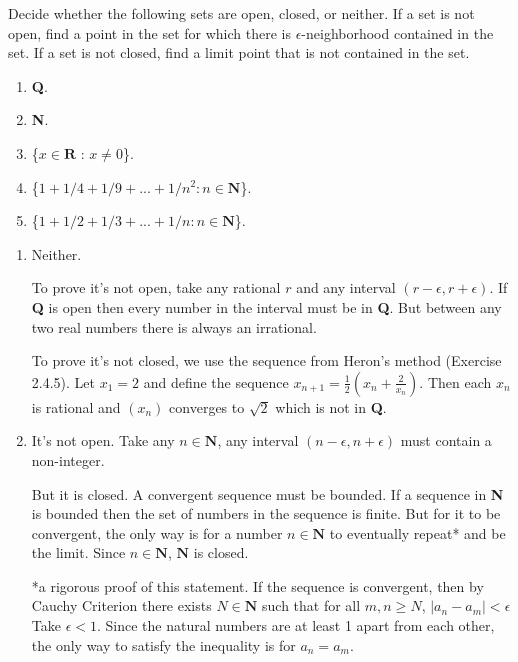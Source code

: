 \documentclass{oxmathproblems}
\begin{document}
\begin{questions}
\miquestion Decide whether the following sets are open, closed, or neither. If a set is not open, find a point in the set for which there is $\epsilon$-neighborhood contained in
the set. If a set is not closed, find a limit point that is not contained in the set.
\begin{enumerate}[label=(\alph*)]
  \item \textbf{Q}.
  \item \textbf{N}.
  \item \{$x \in \textbf{R}$ : $x \neq 0$\}.
  \item \{$1 + 1/4 + 1/9 + ... + 1/n^{2} : n \in \textbf{N}$\}.
  \item \{$1 + 1/2 + 1/3 + ... + 1/n : n \in \textbf{N}$\}.
\end{enumerate}

\begin{solution}
  \begin{enumerate}[label=(\alph*)]
    \item Neither. 
    
    To prove it's not open, take any rational $r$ and any interval $(r-\epsilon, r+\epsilon)$. If \textbf{Q} is open then every number in the interval must be in
    \textbf{Q}. But between any two real numbers there is always an irrational.

    To prove it's not closed, we use the sequence from Heron's method (Exercise 2.4.5). Let $x_{1} = 2$ and define the sequence $x_{n+1} = \frac{1}{2}(x_{n} + \frac{2}{x_{n}})$.
    Then each $x_{n}$ is rational and $(x_{n})$ converges to $\sqrt{2}$ which is not in \textbf{Q}.
  
    \item It's not open. Take any $n \in \textbf{N}$, any interval $(n-\epsilon, n+\epsilon)$ must contain a non-integer.
    
    But it is closed. A convergent sequence must be bounded. If a sequence in \textbf{N} is bounded then the set of numbers in the sequence is finite.
    But for it to be convergent, the only way is for a number $n \in \textbf{N}$ to eventually repeat* and be the limit. Since $n \in \textbf{N}$, $\textbf{N}$ is closed.

    *a rigorous proof of this statement. If the sequence is convergent, then by Cauchy Criterion there exists $N \in \textbf{N}$ such that for all $m, n \geq N$, $|a_{n} - a_{m}| < \epsilon$
    Take $\epsilon < 1$. Since the natural numbers are at least 1 apart from each other, the only way to satisfy the inequality is for $a_{n} = a_{m}$.
  

\end{enumerate}
\end{solution}
\end{questions}
\end{document}
